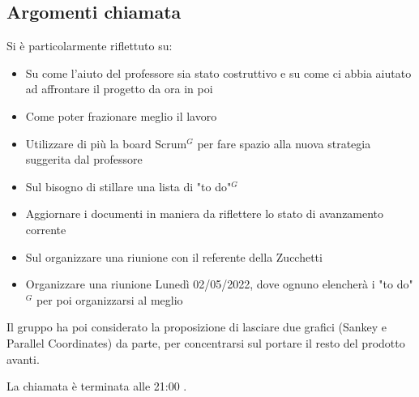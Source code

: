 \subsection{Argomenti chiamata}
Si è particolarmente riflettuto su: 
\begin{itemize} 
 \item Su come l'aiuto del professore sia stato costruttivo e su come ci abbia aiutato ad affrontare 
 il progetto da ora in poi 
 \item Come poter frazionare meglio il lavoro 
 \item Utilizzare di più la board Scrum$^{G}$ per fare spazio alla nuova strategia suggerita dal professore
 \item Sul bisogno di stillare una lista di "to do"$^{G}$ 
 \item Aggiornare i documenti in maniera da riflettere lo stato di avanzamento corrente
 \item Sul organizzare una riunione con il referente della Zucchetti 
 \item Organizzare una riunione Lunedì 02/05/2022, dove ognuno elencherà i "to do"$^{G}$ per poi organizzarsi al meglio 
\end{itemize} 
Il gruppo ha poi considerato la proposizione di lasciare due grafici (Sankey e Parallel Coordinates) da parte, 
per concentrarsi sul portare il resto del prodotto avanti. \newline

La chiamata è terminata alle 21:00 . \newline
 
